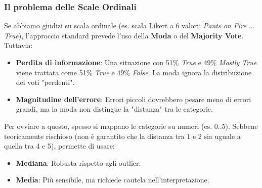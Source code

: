 \documentclass{article}
\begin{document}
    \subsubsection{Il problema delle Scale Ordinali}
      Se abbiamo giudizi su scala ordinale (es. scala Likert a 6 valori: \textit{Pants on Fire} ... \textit{True}), l'approccio standard prevede l'uso della \textbf{Moda} o del \textbf{Majority Vote}. Tuttavia:
      \begin{itemize}
          \item \textbf{Perdita di informazione}: Una situazione con 51\% \textit{True} e 49\% \textit{Mostly True} viene trattata come 51\% \textit{True} e 49\% \textit{False}. La moda ignora la distribuzione dei voti "perdenti".
          \item \textbf{Magnitudine dell'errore}: Errori piccoli dovrebbero pesare meno di errori grandi, ma la moda non distingue la "distanza" tra le categorie.
      \end{itemize}
      Per ovviare a questo, spesso si mappano le categorie su numeri (es. 0..5). Sebbene teoricamente rischioso (non è garantito che la distanza tra 1 e 2 sia uguale a quella tra 4 e 5), permette di usare:
      \begin{itemize}
          \item \textbf{Mediana}: Robusta rispetto agli outlier.
          \item \textbf{Media}: Più sensibile, ma richiede cautela nell'interpretazione.
      \end{itemize}
\end{document}
